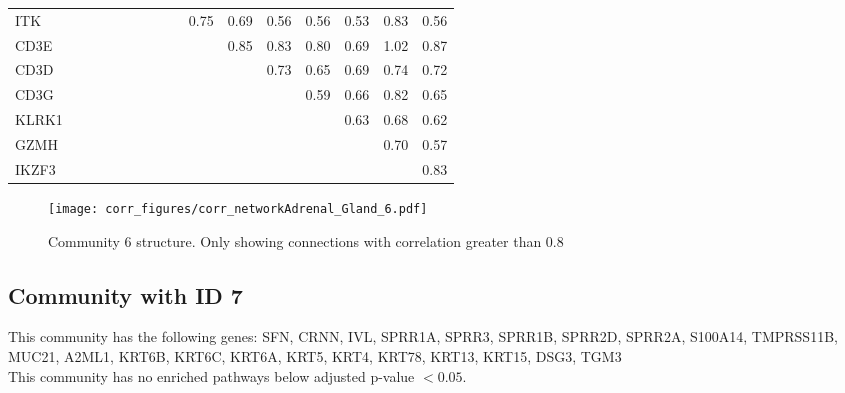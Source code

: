 \begin{longtable}{lrrrrrrrrrrrrrrr}
ITK    &           &              &            &            &             &            &            &           &       0.75 &       0.69 &       0.56 &        0.56 &       0.53 &        0.83 &          0.56 \\
CD3E   &           &              &            &            &             &            &            &           &            &       0.85 &       0.83 &        0.80 &       0.69 &        1.02 &          0.87 \\
CD3D   &           &              &            &            &             &            &            &           &            &            &       0.73 &        0.65 &       0.69 &        0.74 &          0.72 \\
CD3G   &           &              &            &            &             &            &            &           &            &            &            &        0.59 &       0.66 &        0.82 &          0.65 \\
KLRK1  &           &              &            &            &             &            &            &           &            &            &            &             &       0.63 &        0.68 &          0.62 \\
GZMH   &           &              &            &            &             &            &            &           &            &            &            &             &            &        0.70 &          0.57 \\
IKZF3  &           &              &            &            &             &            &            &           &            &            &            &             &            &             &          0.83 \\
\end{longtable}


\begin{figure}[h!]
\centering
\texttt{[image: corr\_figures/corr\_networkAdrenal\_Gland\_6.pdf]}
\caption{Community 6 structure. Only showing connections with correlation greater than 0.8}
\end{figure}




\subsection*{Community with ID 7}
This community has the following genes: SFN, CRNN, IVL, SPRR1A, SPRR3, SPRR1B, SPRR2D, SPRR2A, S100A14, TMPRSS11B, MUC21, A2ML1, KRT6B, KRT6C, KRT6A, KRT5, KRT4, KRT78, KRT13, KRT15, DSG3, TGM3
\\
This community has no enriched pathways below adjusted p-value $< 0.05$.

